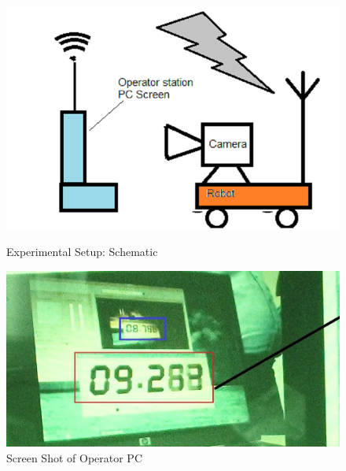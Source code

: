 \begin{figure}
	\begin{minipage}[t]{0.6\textwidth}
		\centering
		\includegraphics[width=\linewidth,scale=2]{Misc_end/fig/DelayExptSetup2}
		\caption{Experimental Setup: Schematic}\label{fig:ExptSetup}
	\end{minipage}
	\hfill
	\begin{minipage}[t]{0.5\textwidth}
		\centering
		\includegraphics[width=\linewidth]{Misc_end/fig/delayMeasureNew} 
		\caption{Screen Shot of Operator PC}\label{fig:ScreenShot}
	\end{minipage}
\end{figure}
